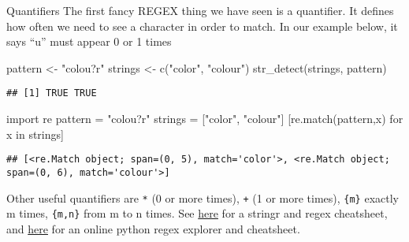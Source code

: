 \documentclass[
  10pt,
  ignorenonframetext,
  aspectratio=169]{beamer}
\newenvironment{Shaded}{\begin{snugshade}}{\end{snugshade}}
\newcommand{\ControlFlowTok}[1]{\textcolor[rgb]{0.94,0.87,0.69}{#1}}
\newcommand{\FunctionTok}[1]{\textcolor[rgb]{0.94,0.94,0.56}{#1}}
\newcommand{\ImportTok}[1]{\textcolor[rgb]{0.80,0.80,0.80}{#1}}
\newcommand{\KeywordTok}[1]{\textcolor[rgb]{0.94,0.87,0.69}{#1}}
\newcommand{\NormalTok}[1]{\textcolor[rgb]{0.80,0.80,0.80}{#1}}
\newcommand{\OperatorTok}[1]{\textcolor[rgb]{0.94,0.94,0.82}{#1}}
\newcommand{\OtherTok}[1]{\textcolor[rgb]{0.94,0.94,0.56}{#1}}
\newcommand{\StringTok}[1]{\textcolor[rgb]{0.80,0.58,0.58}{#1}}
\begin{document}
\begin{frame}[fragile]{Quantifiers}
\protect\hypertarget{quantifiers}{}
The first fancy REGEX thing we have seen is a quantifier. It defines how
often we need to see a character in order to match. In our example
below, it says ``u'' must appear 0 or 1 times

\scriptsize

\begin{Shaded}
\begin{Highlighting}[]
\NormalTok{pattern }\OtherTok{\textless{}{-}} \StringTok{"colou?r"}
\NormalTok{strings }\OtherTok{\textless{}{-}} \FunctionTok{c}\NormalTok{(}\StringTok{"color"}\NormalTok{, }\StringTok{"colour"}\NormalTok{)}
\FunctionTok{str\_detect}\NormalTok{(strings, pattern)}
\end{Highlighting}
\end{Shaded}

\begin{verbatim}
## [1] TRUE TRUE
\end{verbatim}

\begin{Shaded}
\begin{Highlighting}[]
\ImportTok{import}\NormalTok{ re}
\NormalTok{pattern }\OperatorTok{=} \StringTok{"colou?r"}
\NormalTok{strings }\OperatorTok{=}\NormalTok{ [}\StringTok{"color"}\NormalTok{, }\StringTok{"colour"}\NormalTok{]}
\NormalTok{[re.match(pattern,x) }\ControlFlowTok{for}\NormalTok{ x }\KeywordTok{in}\NormalTok{ strings]}
\end{Highlighting}
\end{Shaded}

\begin{verbatim}
## [<re.Match object; span=(0, 5), match='color'>, <re.Match object; span=(0, 6), match='colour'>]
\end{verbatim}

\normalsize

Other useful quantifiers are \texttt{*} (0 or more times), \texttt{+} (1
or more times), \texttt{\{m\}} exactly m times, \texttt{\{m,n\}} from m
to n times. See
\href{https://raw.githubusercontent.com/rstudio/cheatsheets/main/strings.pdf}{here}
for a stringr and regex cheatsheet, and \href{https://pythex.org/}{here}
for an online python regex explorer and cheatsheet.
\end{frame}
\end{document}
